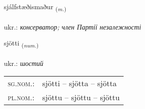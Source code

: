 \documentclass[frontgrid, backgrid]{flacards}\usepackage[]{graphicx}\usepackage[]{xcolor}
\begin{document}
\renewcommand{\flhead}{\vskip5pt \fboxsep=0pt {\small\bfseries\footnotesize Nafnorð | іменник}}
\renewcommand{\fcfoot}{\vskip5pt \fboxsep=0pt \hspace{2pt}{\small\bfseries\footnotesize 3K}}

\renewcommand{\blhead}{\vskip5pt {\small\bfseries\footnotesize Nafnorð | іменник }}
\renewcommand{\bcfoot}{\vskip5pt \hspace{2pt}{\small\bfseries\footnotesize 3K}}


{sjálfstæðismaður \small{\textsubscript{(\textit{m.})}} \\[1ex] %
\textphonetic{[sjaulfstaiðɪsmaðʏr]} \\
ukr.: \emph{консерватор; член Партії незалежності} \\  [2ex]
\renewcommand*{\arraystretch}{0.8}
}

\renewcommand{\flhead}{\vskip5pt \fboxsep=0pt {\small\bfseries\footnotesize Töluorð | чисельник}}
\renewcommand{\fcfoot}{\vskip5pt \fboxsep=0pt \hspace{2pt}{\small\bfseries\footnotesize 3K}}

\renewcommand{\blhead}{\vskip5pt {\small\bfseries\footnotesize Töluorð | чисельник }}
\renewcommand{\bcfoot}{\vskip5pt \hspace{2pt}{\small\bfseries\footnotesize 3K}}


{sjötti \small{\textsubscript{(\textit{num.})}} \\[1ex] %
\textphonetic{[sjœhtɪ]} \\
ukr.: \emph{шостий} \\  [2ex]
\renewcommand*{\arraystretch}{0.8}
\begin{tabular}{ll}
\textsc{sg.nom.}: & sjötti  --  sjötta -- sjötta \\ 
\textsc{pl.nom.}: & sjöttu -- sjöttu -- sjöttu
\end{tabular}
}
\end{document}
